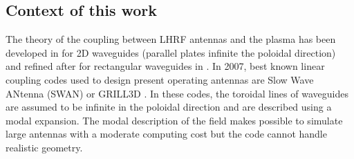 \subsection{Context of this work}
The theory of the coupling between LHRF antennas and the plasma has been developed in  for 2D waveguides (parallel plates infinite the poloidal direction) and refined after for rectangular waveguides in . In 2007, best known linear coupling codes used to design present operating antennas are Slow Wave ANtenna (SWAN)  or GRILL3D . In these codes, the toroidal lines of waveguides are assumed to be infinite in the poloidal direction and are described using a modal expansion. The modal description of the field makes possible to simulate large antennas with a moderate computing cost but the code cannot handle realistic geometry.


